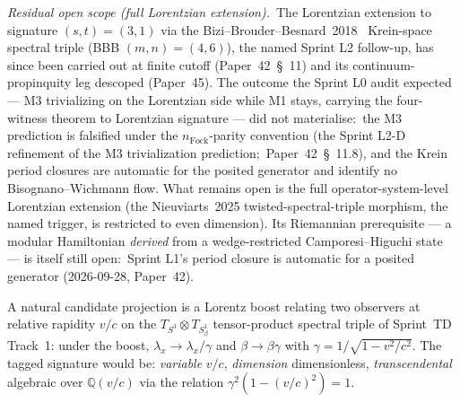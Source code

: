 \documentclass[11pt]{article}
\begin{document}
\begin{enumerate}
\medskip
\noindent\textit{Residual open scope (full Lorentzian extension).}\
The Lorentzian extension to signature $(s, t) = (3, 1)$ via the
Bizi--Brouder--Besnard~2018~\cite{bizi_brouder_besnard2018}
Krein-space spectral triple (BBB $(m, n) = (4, 6)$), the named Sprint L2
follow-up, has since been carried out at finite cutoff
(Paper~42~\S~11) and its continuum-propinquity leg descoped
(Paper~45).  The outcome the Sprint L0 audit expected --- M3
trivializing on the Lorentzian side while M1 stays, carrying the
four-witness theorem to Lorentzian signature --- did not materialise:\
the M3 prediction is falsified under the $n_{\mathrm{Fock}}$-parity
convention (the Sprint L2-D refinement of the M3 trivialization
prediction;\ Paper~42~\S~11.8), and the Krein period closures are automatic for the
posited generator and identify no Bisognano--Wichmann flow.  What
remains open is the full operator-system-level Lorentzian extension
(the Nieuviarts~2025 twisted-spectral-triple morphism, the named
trigger, is restricted to even dimension).  Its Riemannian prerequisite --- a modular
Hamiltonian \emph{derived} from a wedge-restricted Camporesi--Higuchi
state --- is itself still open:\ Sprint L1's period closure is
automatic for a posited generator (2026-09-28, Paper~42).

A natural candidate projection is a Lorentz boost relating two
observers at relative rapidity $v/c$ on the
$T_{S^3} \otimes T_{S^1_\beta}$ tensor-product spectral triple of
Sprint~TD Track~1: under the boost, $\lambda_x \to \lambda_x / \gamma$
and $\beta \to \beta\gamma$ with $\gamma = 1/\sqrt{1 - v^2/c^2}$.
The tagged signature would be: \emph{variable} $v/c$, \emph{dimension}
dimensionless, \emph{transcendental} algebraic over $\mathbb{Q}(v/c)$
via the relation $\gamma^2 (1 - (v/c)^2) = 1$.


\end{enumerate}
\end{document}
